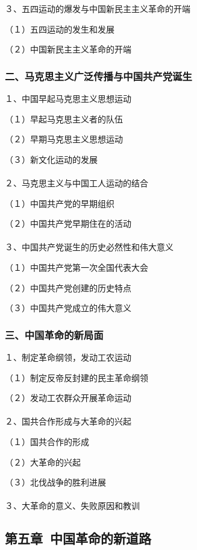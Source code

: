 \documentclass{ctexart}
\begin{document}
３、五四运动的爆发与中国新民主主义革命的开端

（１）五四运动的发生和发展

（２）中国新民主主义革命的开端

\subsubsection{二、马克思主义广泛传播与中国共产党诞生}

１、中国早起马克思主义思想运动

（１）早起马克思主义者的队伍

（２）早期马克思主义思想运动

（３）新文化运动的发展
\\\\

２、马克思主义与中国工人运动的结合

（１）中国共产党的早期组织

（２）中国共产党早期住在的活动
\\\\

３、中国共产党诞生的历史必然性和伟大意义

（１）中国共产党第一次全国代表大会

（２）中国共产党创建的历史特点

（３）中国共产党成立的伟大意义

\subsubsection{三、中国革命的新局面}

１、制定革命纲领，发动工农运动

（１）制定反帝反封建的民主革命纲领

（２）发动工农群众开展革命运动
\\\\

２、国共合作形成与大革命的兴起

（１）国共合作的形成

（２）大革命的兴起

（３）北伐战争的胜利进展
\\\\

３、大革命的意义、失败原因和教训

\subsection{第五章\ 中国革命的新道路}
\end{document}
